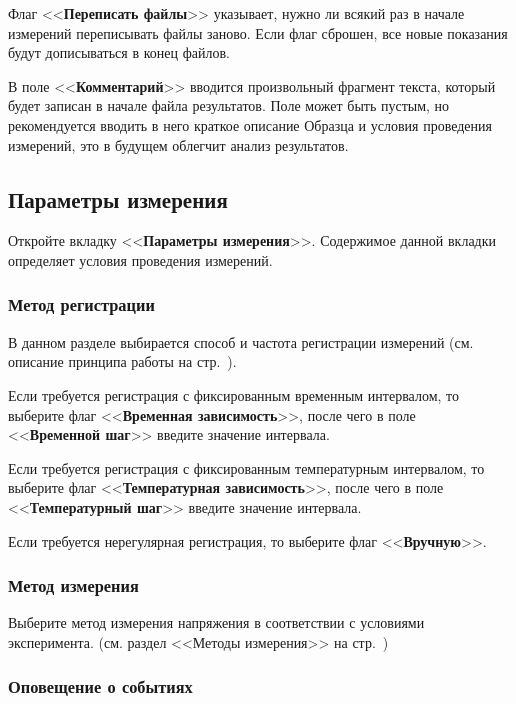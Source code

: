 \documentclass[12pt, a4paper, twocolumn]{report}
\newcommand{\CTL}[1]{<<{\bf #1}>>}
\begin{document}
Флаг \CTL{Переписать файлы} указывает, нужно ли всякий раз в начале измерений переписывать файлы заново. Если флаг сброшен, все новые показания будут дописываться в конец файлов.

В поле \CTL{Комментарий}\label{sec_dut_comment} вводится произвольный фрагмент текста, который будет записан в начале файла результатов. Поле может быть пустым, но рекомендуется вводить в него краткое описание Образца и условия проведения измерений, это в будущем облегчит анализ результатов.

\subsection{Параметры измерения}

Откройте вкладку \CTL{Параметры измерения}. Содержимое данной вкладки определяет условия проведения измерений.

\subsubsection{Метод регистрации}
\label{sec_reg_method}

В данном разделе выбирается способ и частота регистрации измерений (см. описание принципа работы на стр.~\pageref{sec_registration_types}).

Если требуется регистрация с фиксированным временным интервалом, то выберите флаг \CTL{Временная зависимость}, после чего в поле \CTL{Временной шаг} введите значение интервала.

Если требуется регистрация с фиксированным температурным интервалом, то выберите флаг \CTL{Температурная зависимость}, после чего в поле \CTL{Температурный шаг} введите значение интервала.

Если требуется нерегулярная регистрация, то выберите флаг \CTL{Вручную}.

\subsubsection{Метод измерения}

Выберите метод измерения напряжения в соответствии с условиями эксперимента. (см. раздел <<Методы измерения>> на стр.~\pageref{sec_measurement_method})

\subsubsection{Оповещение о событиях}
\end{document}

